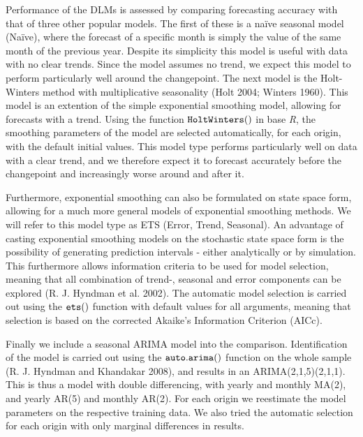 \documentclass[]{article}
\begin{document}
Performance of the DLMs is assessed by comparing forecasting accuracy
with that of three other popular models. The first of these is a naïve
seasonal model (Naïve), where the forecast of a specific month is simply
the value of the same month of the previous year. Despite its simplicity
this model is useful with data with no clear trends. Since the model
assumes no trend, we expect this model to perform particularly well
around the changepoint. The next model is the Holt-Winters method with
multiplicative seasonality (Holt 2004; Winters 1960). This model is an
extention of the simple exponential smoothing model, allowing for
forecasts with a trend. Using the function \({\tt HoltWinters()}\) in
base \emph{R}, the smoothing parameters of the model are selected
automatically, for each origin, with the default initial values. This
model type performs particularly well on data with a clear trend, and we
therefore expect it to forecast accurately before the changepoint and
increasingly worse around and after it.

Furthermore, exponential smoothing can also be formulated on state space
form, allowing for a much more general models of exponential smoothing
methods. We will refer to this model type as ETS (Error, Trend,
Seasonal). An advantage of casting exponential smoothing models on the
stochastic state space form is the possibility of generating prediction
intervals - either analytically or by simulation. This furthermore
allows information criteria to be used for model selection, meaning that
all combination of trend-, seasonal and error components can be explored
(R. J. Hyndman et al. 2002). The automatic model selection is carried
out using the \({\tt ets()}\) function with default values for all
arguments, meaning that selection is based on the corrected Akaike's
Information Criterion (AICc).

Finally we include a seasonal ARIMA model into the comparison.
Identification of the model is carried out using the
\({\tt auto.arima()}\) function on the whole sample (R. J. Hyndman and
Khandakar 2008), and results in an ARIMA(2,1,5)(2,1,1). This is thus a
model with double differencing, with yearly and monthly MA(2), and
yearly AR(5) and monthly AR(2). For each origin we reestimate the model
parameters on the respective training data. We also tried the automatic
selection for each origin with only marginal differences in results.
\end{document}
